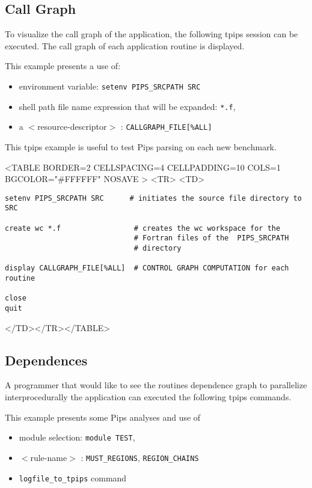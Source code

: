 \documentclass[a4paper,12pt]{article}
\begin{document}
\subsection{Call Graph}
\label{exm1}

To visualize the  call graph of the application, the following tpips
session can be executed. The call graph of each application routine is
displayed. 

This example presents a use of:

\begin{itemize}
\item environment variable: \verb+setenv PIPS_SRCPATH SRC+
\item shell path file name expression that will be expanded: \verb+*.f+,
\item a $<$resource-descriptor$>$ : \verb+CALLGRAPH_FILE[%ALL]+
\end{itemize}
This tpips example is useful to test Pips parsing   on each  new
benchmark. 

\begin{rawhtml}
<TABLE BORDER=2 CELLSPACING=4 CELLPADDING=10 COLS=1  BGCOLOR="#FFFFFF" NOSAVE >
<TR>
<TD>
\end{rawhtml}
{\bf
\begin{verbatim}
setenv PIPS_SRCPATH SRC      # initiates the source file directory to SRC

create wc *.f                 # creates the wc workspace for the
                              # Fortran files of the  PIPS_SRCPATH 
                              # directory

display CALLGRAPH_FILE[%ALL]  # CONTROL GRAPH COMPUTATION for each routine

close 
quit

\end{verbatim}
}

\begin{rawhtml}
</TD></TR></TABLE>
\end{rawhtml}
\subsection{Dependences}
\label{exm2}
A programmer that would like to see the routines dependence graph to parallelize
interprocedurally the application can executed the following tpips
commands. 

This example presents some Pips analyses and  use of 
\begin{itemize}
\item module selection: \verb+module TEST+,
\item $<$rule-name$>$ : \verb+MUST_REGIONS+, \verb+REGION_CHAINS+ 
\item \verb+logfile_to_tpips+ command
\end{itemize}
\end{document}
